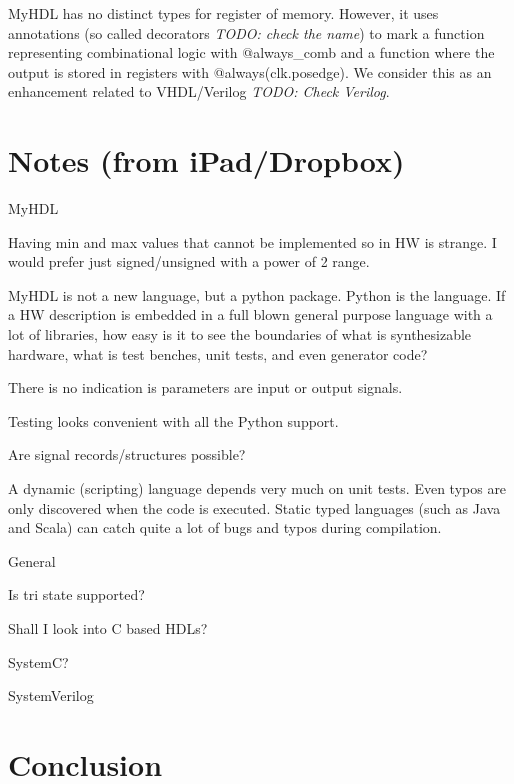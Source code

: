 \documentclass[10pt, conference, compsocconf]{IEEEtran}
\newcommand{\code}[1]{{\small{\textsf{#1}}}}
\newcommand{\todo}[1]{{\emph{TODO: #1}}}
\begin{document}
MyHDL has no distinct types for register of memory. However, it uses annotations
(so called decorators \todo{check the name}) to mark a function representing
combinational logic with \code{@always\_comb} and a function where the
output is stored in registers with \code{@always(clk.posedge)}. We consider
this as an enhancement related to VHDL/Verilog \todo{Check Verilog}.


\section{Notes (from iPad/Dropbox)}

MyHDL

Having min and max values that cannot be implemented so in HW is strange. I would prefer just signed/unsigned with a power of 2 range.

MyHDL is not a new language, but a python package. Python is the language. If a HW description is embedded in a full blown general purpose language with a lot of libraries, how easy is it to see the boundaries of what is synthesizable hardware, what is test benches, unit tests, and even generator code?

There is no indication is parameters are input or output signals.

Testing looks convenient with all the Python support.

Are signal records/structures possible?

A dynamic (scripting) language depends very much on unit tests. Even typos are only
discovered when the code is executed. Static typed languages (such as Java
and Scala) can catch quite a lot of bugs and typos during compilation.

General

Is tri state supported?

Shall I look into C based HDLs?

SystemC?

SystemVerilog

\section{Conclusion}
\label{sec:conclusion}





\end{document}

